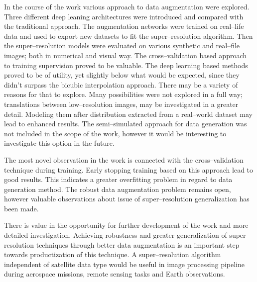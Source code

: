 In the course of the work various approach to data augmentation were explored.
Three different deep leaning architectures were introduced and compared with the traditional approach.
The augmentation networks were trained on real--life data and used to export new datasets to fit the super--resolution algorithm.
Then the super--resolution models were evaluated on various synthetic and real--file images; both in numerical and visual way.
The cross--validation based approach to training supervision proved to be valuable.
The deep learning based methods proved to be of utility, yet slightly below what would be expected, since they didn't surpass the bicubic interpolation approach.
There may be a variety of reasons for that to explore.
Many possibilities were not explored in a full way; translations between low--resolution images, may be investigated in a greater detail.
Modeling them after distribution extracted from a real--world dataset may lead to enhanced results.
The semi--simulated approach for data generation was not included in the scope of the work, however it would be interesting to investigate this option in the future.

The most novel observation in the work is connected with the cross--validation technique during training.
Early stopping training based on this approach lead to good results.
This indicates a greater overfitting problem in regard to data generation method.
The robust data augmentation problem remains open, however valuable observations about issue of super--resolution generalization has been made.

There is value in the opportunity for further development of the work and more detailed investigation.
Achieving robustness and greater generalization of super--resolution techniques through better data augmentation is an important step towards productization of this technique.
A super--resolution algorithm independent of satellite data type would be useful in image  processing pipeline during aerospace missions, remote sensing tasks and Earth observations.